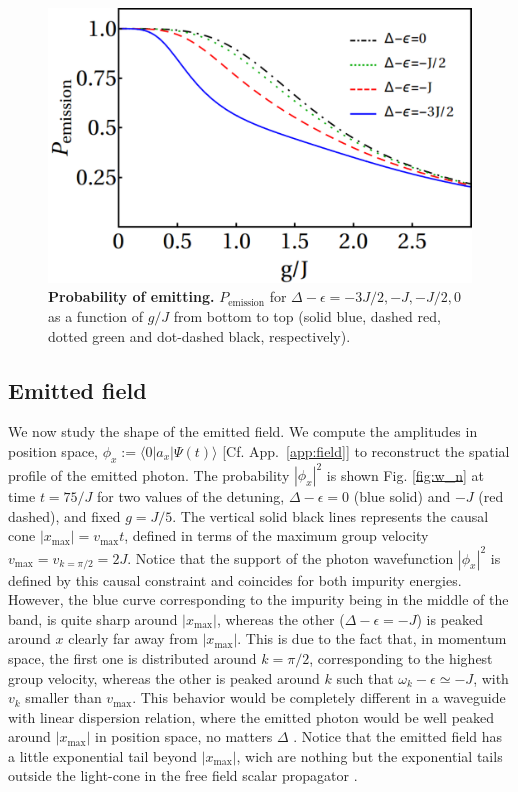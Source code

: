 \documentclass[aps,pra,twocolumn,floatfix,superscriptaddress]{revtex4-1}%
\begin{document}
\begin{figure}[thb!]
\includegraphics[width=1.0\columnwidth]{p_emission_a.pdf}
\caption{{\bf Probability of emitting.} $P_\text{emission}$ for $\Delta-\epsilon=-3J/2,-J,-J/2,0$ as a function of $g/J$ from bottom to top (solid blue, dashed red, dotted green and dot-dashed black, respectively).}\label{fig:P_emi}
\end{figure}


\subsection{Emitted field}

We now study the shape of the emitted field. We compute the amplitudes in position space, $\phi_x:=\langle 0|a_x|\Psi(t)\rangle$ [Cf. App.\ \ref{app:field}] to reconstruct the spatial profile of the emitted photon. The probability $|\phi_x|^2$ is shown Fig. \ref{fig:w_n} at time $t=75/J$ for two values of the detuning, $\Delta-\epsilon=0$ (blue solid) and $-J$ (red dashed), and fixed $g=J/5$. The vertical solid black lines represents the causal cone $|x_\text{max}|=v_\text{max}t$, defined in terms of the maximum group velocity $v_\text{max}=v_{k=\pi/2}=2J$. Notice that the support of the photon wavefunction $|\phi_x|^2$ is defined by this causal constraint and coincides for both impurity energies. However, the blue curve corresponding to the impurity being in the middle of the band, is quite sharp around $|x_\text{max}|$, whereas the other ($\Delta-\epsilon=-J$) is peaked around $x$ clearly far away from $|x_\text{max}|$. This is due to the fact that, in momentum space, the first one is distributed around $k=\pi/2$, corresponding to the highest group velocity, whereas the other is peaked around $k$ such that $\omega_k-\epsilon\simeq -J$, with $v_k$ smaller than $v_\text{max}$. This behavior would be completely different in a waveguide with linear dispersion relation, where the emitted photon would be well peaked around $|x_\text{max}|$ in position space, no matters $\Delta$ \cite{Eberly2002}. Notice that the emitted field has a little exponential tail beyond $|x_\text{max}|$, 
wich are nothing but the exponential tails outside the light-cone in the free field scalar propagator \cite[Sect. 4.5]{Greiner-fq}.
\end{document}
